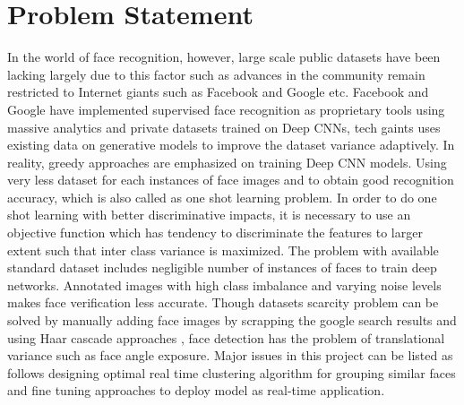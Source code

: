 \documentclass[a4paper,12pt, twoside]{NITKReport}
\begin{document}
\section{Problem Statement}
\label{prob}
	 In the world of face recognition, however, large scale public datasets have been lacking largely due to this factor such as advances in the community remain restricted to Internet giants such as Facebook and Google etc. Facebook \cite{1} and Google \cite{2} have implemented supervised face recognition as proprietary tools using massive analytics and private datasets trained on Deep CNNs, tech gaints uses existing data on generative models to improve the dataset variance adaptively. In reality, greedy approaches are emphasized on training Deep CNN models. Using very less dataset for each instances of face images and to obtain good recognition accuracy, which is also called as one shot learning problem. In order to do one shot learning with better discriminative impacts, it is necessary to use an objective function which has tendency to discriminate the features to larger extent such that inter class variance is maximized. The problem with available standard dataset includes negligible number of instances of faces to train deep networks. Annotated images with high class imbalance and varying noise levels makes face verification less accurate. Though datasets scarcity problem can be solved by manually adding face images by scrapping the google search results and using Haar cascade approaches \cite{viola2001rapid}, face detection has the problem of translational variance such as face angle exposure. Major issues in this project can be listed as follows designing optimal real time clustering algorithm for grouping similar faces and fine tuning approaches to deploy model as real-time application.

		
\end{document}
